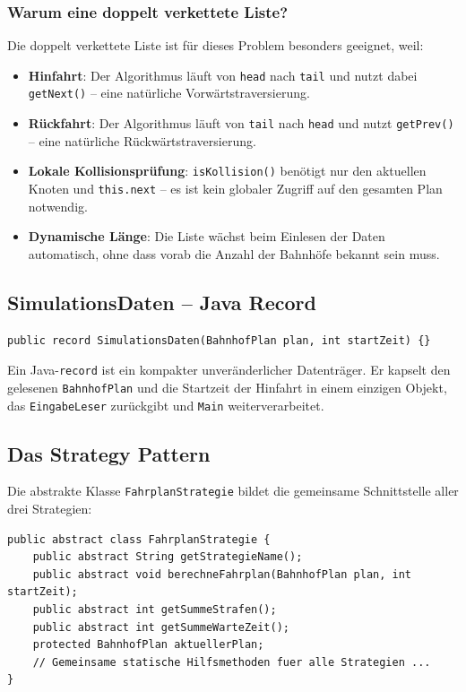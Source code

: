 \documentclass[12pt,a4paper]{article}
\begin{document}
\subsubsection{Warum eine doppelt verkettete Liste?}

Die doppelt verkettete Liste ist für dieses Problem besonders geeignet, weil:

\begin{itemize}
    \item \textbf{Hinfahrt}: Der Algorithmus läuft von \texttt{head} nach \texttt{tail} und nutzt dabei \texttt{getNext()} -- eine natürliche Vorwärtstraversierung.
    \item \textbf{Rückfahrt}: Der Algorithmus läuft von \texttt{tail} nach \texttt{head} und nutzt \texttt{getPrev()} -- eine natürliche Rückwärtstraversierung.
    \item \textbf{Lokale Kollisionsprüfung}: \texttt{isKollision()} benötigt nur den aktuellen Knoten und \texttt{this.next} -- es ist kein globaler Zugriff auf den gesamten Plan notwendig.
    \item \textbf{Dynamische Länge}: Die Liste wächst beim Einlesen der Daten automatisch, ohne dass vorab die Anzahl der Bahnhöfe bekannt sein muss.
\end{itemize}

\subsection{SimulationsDaten -- Java Record}

\begin{lstlisting}[caption={SimulationsDaten als Record}]
public record SimulationsDaten(BahnhofPlan plan, int startZeit) {}
\end{lstlisting}

Ein Java-\texttt{record} ist ein kompakter unveränderlicher Datenträger. Er kapselt den gelesenen \texttt{BahnhofPlan} und die Startzeit der Hinfahrt in einem einzigen Objekt, das \texttt{EingabeLeser} zurückgibt und \texttt{Main} weiterverarbeitet.

\subsection{Das Strategy Pattern}

Die abstrakte Klasse \texttt{FahrplanStrategie} bildet die gemeinsame Schnittstelle aller drei Strategien:

\begin{lstlisting}[caption={Abstrakte Basisklasse FahrplanStrategie}]
public abstract class FahrplanStrategie {
    public abstract String getStrategieName();
    public abstract void berechneFahrplan(BahnhofPlan plan, int startZeit);
    public abstract int getSummeStrafen();
    public abstract int getSummeWarteZeit();
    protected BahnhofPlan aktuellerPlan;
    // Gemeinsame statische Hilfsmethoden fuer alle Strategien ...
}
\end{lstlisting}
\end{document}
